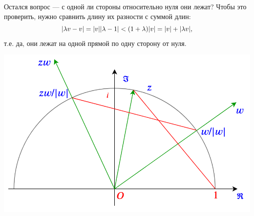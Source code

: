\begin{enumerate}
Остался вопрос --- с одной ли стороны относительно нуля они лежат? Чтобы это проверить, нужно сравнить длину их разности с суммой длин:
$$
|\lambda v-v|=|v||\lambda-1|<(1+\lambda)|v|=|v|+|\lambda v|,
$$
т.е. да, они лежат на одной прямой по одну сторону от нуля.
\begin{center}
\includegraphics[scale=0.4]{complex-ring2.png}
\end{center}


\end{enumerate}
